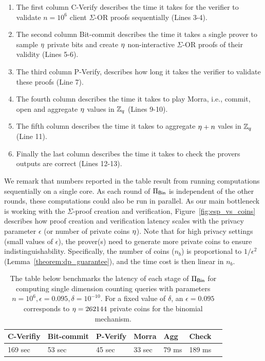 \begin{enumerate}
    \item{The first column C-Verify describes the time it takes for the verifier to validate $n=10^6$ client $\Sigma$-OR proofs sequentially (Lines 3-4).}

    \item{The second column Bit-commit describes the time it takes a single prover to sample $\eta$ private bits and create $\eta$ non-interactive $\Sigma$-OR proofs of their validity (Lines 5-6).}

    \item{The third column P-Verify, describes how long it takes the verifier to validate these proofs (Line 7).}

    \item{The fourth column describes the time it takes to play Morra, i.e., commit, open and aggregate $\eta$ values in $\mathbb{Z}_q$ (Lines 9-10).}

    \item{The fifth column describes the time it takes to aggregate $\eta + n$ vales in $\mathbb{Z}_q$ (Line 11).}

    \item{Finally the last column describes the time it takes to check the provers outputs are correct (Lines 12-13).}
\end{enumerate}

We remark that numbers reported in the table result from running computations sequentially on a single core. 
As each round of $\Pi_{\mathsf{Bin}}$ is independent of the other rounds, these computations could also be run in parallel. 
As our main bottleneck is working with the $\Sigma$-proof creation and verification, Figure~\ref{fig:esp_vs_coins} describes how proof creation and verification latency scales with the privacy parameter $\epsilon$ (or number of private coins $\eta$). Note that for high privacy settings (small values of $\epsilon$), the prover(s) need to generate more private coins to ensure indistinguishability. Specifically, the number of coins ($n_b$) is proportional to $1/\epsilon^2$ (Lemma~\ref{theorem:dp_guarantee}), and the time cost is then linear in $n_b$. 


 
 \begin{table}[]
 \caption{The table below benchmarks the latency of each stage of $\Pi_{\mathsf{Bin}}$ for computing single dimension counting queries with parameters $n=10^6, \epsilon=0.095, \delta= 10^{-10} $.  For a fixed value of $\delta$, an $\epsilon=0.095$ corresponds to $\eta=262144$ private coins for the binomial mechanism.}
\label{tab:pipeline}
\begin{tabular}{|l|l|l|l|l|l|l|}
\hline
C-Verifiy & Bit-commit & P-Verify & Morra & Agg  & Check     \\ \hline
169 sec & 53 sec        & 45 sec   & 33 sec & 79 ms  & 189 ms \\ \hline
\end{tabular}
\end{table}

